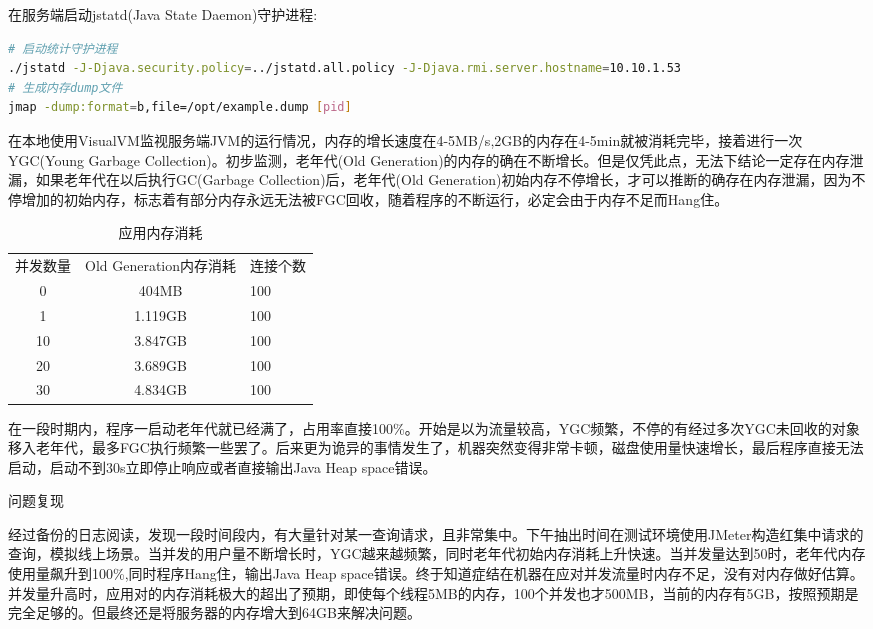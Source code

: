 \documentclass[8pt]{book}
\makeatletter
\numberwithin{dummy}{section}
\theoremstyle{ocrenumbox}
\theoremstyle{blacknumex}
\theoremstyle{blacknumbox}
\theoremstyle{ocrenum}
\renewcommand\paragraph{\@startsection{paragraph}{4}{\z@}
	{-2ex \@plus-.2ex \@minus .2ex}
	{.1ex}
	{\normalfont\small\sffamily\bfseries}}
\makeatother
\begin{document}
在服务端启动jstatd(Java State Daemon)守护进程:

\begin{lstlisting}[language=Bash]
# 启动统计守护进程
./jstatd -J-Djava.security.policy=../jstatd.all.policy -J-Djava.rmi.server.hostname=10.10.1.53
# 生成内存dump文件
jmap -dump:format=b,file=/opt/example.dump [pid]
\end{lstlisting}

在本地使用VisualVM监视服务端JVM的运行情况，内存的增长速度在4-5MB/s,2GB的内存在4-5min就被消耗完毕，接着进行一次YGC(Young Garbage Collection)。初步监测，老年代(Old Generation)的内存的确在不断增长。但是仅凭此点，无法下结论一定存在内存泄漏，如果老年代在以后执行GC(Garbage Collection)后，老年代(Old Generation)初始内存不停增长，才可以推断的确存在内存泄漏，因为不停增加的初始内存，标志着有部分内存永远无法被FGC回收，随着程序的不断运行，必定会由于内存不足而Hang住。

\begin{table}[htbp]
	\caption{应用内存消耗}
	\label{table:appmemoryusing}
	\begin{center}
		\begin{tabular}{|c|c|p{2cm}|}
			\hline
			\multirow{1}{*}{并发数量}
			& \multicolumn{1}{c|}{Old Generation内存消耗} 
			& \multicolumn{1}{c|}{连接个数}\\			
			\cline{1-3}
			0 &  404MB  & 100 \\
			\hline
			1 &  1.119GB  & 100 \\
			\hline
			10 &  3.847GB  & 100 \\
			\hline
			20 &  3.689GB  & 100 \\
			\hline
			30 &  4.834GB  & 100 \\
			\hline											
		\end{tabular}	
	\end{center}
\end{table}

在一段时期内，程序一启动老年代就已经满了，占用率直接100\%。开始是以为流量较高，YGC频繁，不停的有经过多次YGC未回收的对象移入老年代，最多FGC执行频繁一些罢了。后来更为诡异的事情发生了，机器突然变得非常卡顿，磁盘使用量快速增长，最后程序直接无法启动，启动不到30s立即停止响应或者直接输出Java Heap space错误。

\paragraph{问题复现}

经过备份的日志阅读，发现一段时间段内，有大量针对某一查询请求，且非常集中。下午抽出时间在测试环境使用JMeter构造红集中请求的查询，模拟线上场景。当并发的用户量不断增长时，YGC越来越频繁，同时老年代初始内存消耗上升快速。当并发量达到50时，老年代内存使用量飙升到100\%,同时程序Hang住，输出Java Heap space错误。终于知道症结在机器在应对并发流量时内存不足，没有对内存做好估算。并发量升高时，应用对的内存消耗极大的超出了预期，即使每个线程5MB的内存，100个并发也才500MB，当前的内存有5GB，按照预期是完全足够的。但最终还是将服务器的内存增大到64GB来解决问题。
\end{document}
